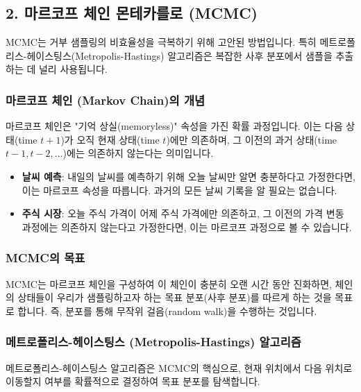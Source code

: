 \documentclass[11pt,a4paper]{book}
\theoremstyle{definition}
\begin{document}
\subsection*{2. 마르코프 체인 몬테카를로 (MCMC)}
MCMC는 거부 샘플링의 비효율성을 극복하기 위해 고안된 방법입니다. 특히 메트로폴리스-헤이스팅스(Metropolis-Hastings) 알고리즘은 복잡한 사후 분포에서 샘플을 추출하는 데 널리 사용됩니다.

\subsubsection*{마르코프 체인 (Markov Chain)의 개념}
\begin{infobox}[title=마르코프 속성 (Markovian Property): 기억 상실]
마르코프 체인은 "기억 상실(memoryless)" 속성을 가진 확률 과정입니다. 이는 다음 상태(time $t+1$)가 오직 현재 상태(time $t$)에만 의존하며, 그 이전의 과거 상태(time $t-1, t-2, \dots$)에는 의존하지 않는다는 의미입니다.
\end{infobox}

\begin{examplebox}[title=마르코프 속성 비유]
\begin{itemize}
    \item \textbf{날씨 예측}: 내일의 날씨를 예측하기 위해 오늘 날씨만 알면 충분하다고 가정한다면, 이는 마르코프 속성을 따릅니다. 과거의 모든 날씨 기록을 알 필요는 없습니다.
    \item \textbf{주식 시장}: 오늘 주식 가격이 어제 주식 가격에만 의존하고, 그 이전의 가격 변동 과정에는 의존하지 않는다고 가정한다면, 이는 마르코프 과정으로 볼 수 있습니다.
\end{itemize}
\end{examplebox}

\subsubsection*{MCMC의 목표}
MCMC는 마르코프 체인을 구성하여 이 체인이 충분히 오랜 시간 동안 진화하면, 체인의 상태들이 우리가 샘플링하고자 하는 목표 분포(사후 분포)를 따르게 하는 것을 목표로 합니다. 즉, 분포를 통해 무작위 걸음(random walk)을 수행하는 것입니다.

\subsubsection*{메트로폴리스-헤이스팅스 (Metropolis-Hastings) 알고리즘}
메트로폴리스-헤이스팅스 알고리즘은 MCMC의 핵심으로, 현재 위치에서 다음 위치로 이동할지 여부를 확률적으로 결정하여 목표 분포를 탐색합니다.
\end{document}
